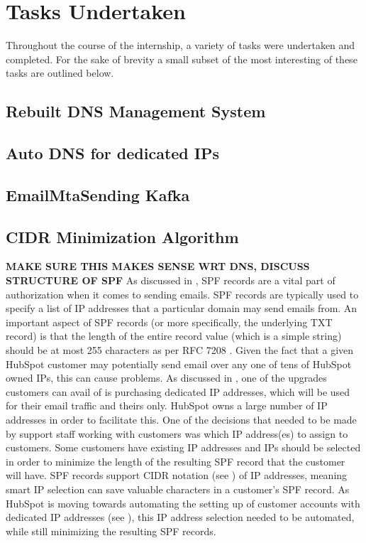 \chapter{Tasks Undertaken}
Throughout the course of the internship, a variety of tasks were undertaken and completed.  
For the sake of brevity a small subset of the most interesting of these tasks are outlined below. 

\section{Rebuilt DNS Management System}

\section{Auto DNS for dedicated IPs} \label{sec:autoDns}

\section{EmailMtaSending Kafka}

\section{CIDR Minimization Algorithm}
\textbf{MAKE SURE THIS MAKES SENSE WRT DNS, DISCUSS STRUCTURE OF SPF}\hfill\break
As discussed in , SPF records are a vital part of authorization when it comes to sending emails. SPF records are typically used to specify a list of IP addresses that a particular domain may send emails from. An important aspect of SPF records (or more specifically, the underlying TXT record) is that the length of the entire record value (which is a simple string) should be at most 255 characters as per RFC 7208 \cite{spfRFC}. Given the fact that a given HubSpot customer may potentially send email over any one of tens of HubSpot owned IPs, this can cause problems. As discussed in , one of the upgrades customers can avail of is purchasing dedicated IP addresses, which will be used for their email traffic and theirs only. HubSpot owns a large number of IP addresses in order to facilitate this. One of the decisions that needed to be made by support staff working with customers was which IP address(es) to assign to customers. Some customers have existing IP addresses and IPs should be selected in order to minimize the length of the resulting SPF record that the customer will have. SPF records support CIDR notation (see ) of IP addresses, meaning smart IP selection can save valuable characters in a customer's SPF record. As HubSpot is moving towards automating the setting up of customer accounts with dedicated IP addresses (see ), this IP address selection needed to be automated, while still minimizing the resulting SPF records.

